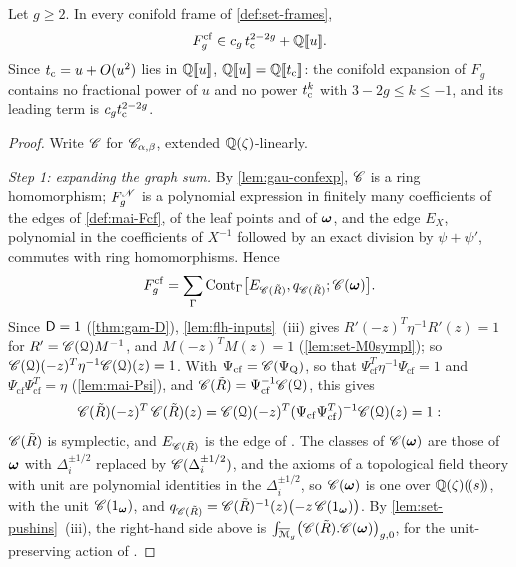 \begin{cor}
\label{cor:mai-gap}
Let $g\geq2$. In every conifold frame of \cref{def:set-frames},
\[
F_g^{\mathrm{cf}}\in c_g\,t_{\mathrm{c}}^{2-2g}+\mathbb{Q}[\![ u ]\!].
\]
Since $t_{\mathrm{c}}=u+O(u^2)$ lies in $\mathbb{Q}[\![ u ]\!]$, $\mathbb{Q}[\![ u ]\!]=\mathbb{Q}[\![ t_{\mathrm{c}} ]\!]$: the conifold expansion of $F_g$ contains no fractional power of $u$ and no power $t_{\mathrm{c}}^k$ with $3-2g\leq k\leq-1$, and its leading term is $c_gt_{\mathrm{c}}^{2-2g}$.
\end{cor}

\begin{proof}
Write $\mathscr{C}$ for $\mathscr{C}_{\alpha,\beta}$, extended $\mathbb{Q}(\zeta)$-linearly.

\emph{Step 1: expanding the graph sum.} By \cref{lem:gau-confexp}, $\mathscr{C}$ is a ring homomorphism; $F_g^{\mathscr{N}}$ is a polynomial expression in finitely many coefficients of the edges of \cref{def:mai-Fcf}, of the leaf points and of $\boldsymbol{\omega}$, and the edge $E_X$, polynomial in the coefficients of $X^{-1}$ followed by an exact division by $\psi+\psi'$, commutes with ring homomorphisms. Hence
\[
F_g^{\mathrm{cf}}=\sum_\Gamma\mathrm{Cont}_\Gamma\bigl[E_{\mathscr{C}(\tilde R)},q_{\mathscr{C}(\tilde R)};\mathscr{C}(\boldsymbol{\omega})\bigr].
\]
Since $\mathsf{D}=1$ (\cref{thm:gam-D}), \cref{lem:flh-inputs}~(iii) gives $R'(-z)^T\eta^{-1}R'(z)=1$ for $R'=\mathscr{C}(\mathcal{Q})M^{-1}$, and $M(-z)^TM(z)=1$ (\cref{lem:set-M0sympl}); so $\mathscr{C}(\mathcal{Q})(-z)^T\eta^{-1}\mathscr{C}(\mathcal{Q})(z)=1$. With $\Psi_{\mathrm{cf}}=\mathscr{C}(\Psi_{\mathrm Q})$, so that $\Psi_{\mathrm{cf}}^T\eta^{-1}\Psi_{\mathrm{cf}}=1$ and $\Psi_{\mathrm{cf}}\Psi_{\mathrm{cf}}^T=\eta$ (\cref{lem:mai-Psi}), and $\mathscr{C}(\tilde R)=\Psi_{\mathrm{cf}}^{-1}\mathscr{C}(\mathcal{Q})$, this gives
\[
\mathscr{C}(\tilde R)(-z)^T\,\mathscr{C}(\tilde R)(z)=\mathscr{C}(\mathcal{Q})(-z)^T(\Psi_{\mathrm{cf}}\Psi_{\mathrm{cf}}^T)^{-1}\mathscr{C}(\mathcal{Q})(z)=1 :
\]
$\mathscr{C}(\tilde R)$ is symplectic, and $E_{\mathscr{C}(\tilde R)}$ is the edge of \cite[Def.~2.2]{PPZ15}. The classes of $\mathscr{C}(\boldsymbol{\omega})$ are those of $\boldsymbol{\omega}$ with $\Delta_i^{\pm1/2}$ replaced by $\mathscr{C}(\Delta_i^{\pm1/2})$, and the axioms of a topological field theory with unit are polynomial identities in the $\Delta_i^{\pm1/2}$, so $\mathscr{C}(\boldsymbol{\omega})$ is one over $\mathbb{Q}(\zeta)(\!(s)\!)$, with the unit $\mathscr{C}(1_{\boldsymbol{\omega}})$, and $q_{\mathscr{C}(\tilde R)}=\mathscr{C}(\tilde R)^{-1}(z)\bigl(-z\,\mathscr{C}(1_{\boldsymbol{\omega}})\bigr)$. By \cref{lem:set-pushins}~(iii), the right-hand side above is $\int_{\overline{\mathcal M}_g}\bigl(\mathscr{C}(\tilde R).\mathscr{C}(\boldsymbol{\omega})\bigr)_{g,0}$, for the unit-preserving action of \cite[Def.~2.13]{PPZ15}.


\end{proof}
